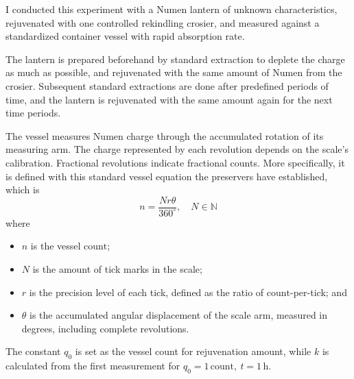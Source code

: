 \documentclass[11pt,a4paper]{article}
\begin{document}
	I conducted this experiment with a Numen lantern of unknown characteristics, rejuvenated with one controlled rekindling crosier, and measured against a standardized container vessel with rapid absorption rate.
	
	The lantern is prepared beforehand by standard extraction to deplete the charge as much as possible, and rejuvenated with the same amount of Numen from the crosier. Subsequent standard extractions are done after predefined periods of time, and the lantern is rejuvenated with the same amount again for the next time periods.
	
	The vessel measures Numen charge through the accumulated rotation of its measuring arm. The charge represented by each revolution depends on the scale's calibration. Fractional revolutions indicate fractional counts. More specifically, it is defined with this standard vessel equation the preservers have established, which is
	\begin{equation}
	n = \frac{Nr\theta}{360^\circ},
	\quad N \in \mathbb{N}
	\end{equation}
	where
	\begin{itemize}
		\item \(n\) is the vessel \(\text{count}\);
		\item \(N\) is the amount of tick marks in the scale;
		\item \(r\) is the precision level of each tick, defined as the ratio of \(\text{count}\)-per-tick; and
		\item \(\theta\) is the accumulated angular displacement of the scale arm, measured in degrees, including complete revolutions.
	\end{itemize}
	
	The constant \(q_0\) is set as the vessel count for rejuvenation amount, while \(k\) is calculated from the first measurement for \(q_0 = 1\,\text{count}, \ t = 1\,\text{h}\).
	
\end{document}
